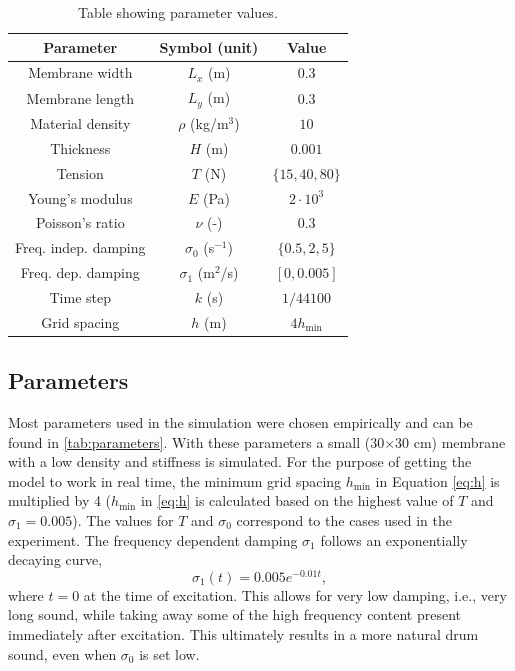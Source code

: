 \documentclass{article}
\begin{document}
\begin{table}[t]
\centering
\begin{tabular}{|c|c|c|}
    \hline
    Parameter & Symbol (unit) & Value \\
    \hline
    Membrane width & $L_x$ (m) & $0.3$\\
    Membrane length & $L_y$ (m) & $0.3$ \\
    Material density & $\rho$ (kg/m$^3$)& $10$ \\
    Thickness & $H$ (m) & $0.001$ \\
    Tension & $T$ (N) & $\{15, 40, 80\}$ \\
    Young's modulus & $E$ (Pa)& $2\cdot 10^3$ \\
    Poisson's ratio & $\nu$ (-)& $0.3$ \\
    Freq. indep. damping & $\sigma_0$ (s$^{-1}$) & $\{0.5, 2, 5\}$\\
    Freq. dep. damping & $\sigma_1$ (m$^2$/s) & $[0, 0.005]$\\
    Time step & $k$ (s) & $1/44100$\\
    Grid spacing & $h$ (m) & $4h_\text{min}$\\
    \hline
\end{tabular}
\caption{Table showing parameter values.}\label{tab:parameters}
\end{table}

\subsection{Parameters}
Most parameters used in the simulation were chosen empirically and can be found in \autoref{tab:parameters}. With these parameters a small (30$\times$30 cm) membrane with a low density and stiffness is simulated. For the purpose of getting the model to work in real time, the minimum grid spacing $h_\text{min}$ in Equation \eqref{eq:h} is multiplied by 4 ($h_\text{min}$ in \eqref{eq:h} is calculated based on the highest value of $T$ and $\sigma_1 = 0.005$). The values for $T$ and $\sigma_0$ correspond to the cases used in the experiment. The frequency dependent damping  $\sigma_1$ follows an exponentially decaying curve, 
\begin{equation}
    \sigma_1(t) = 0.005e^{-0.01 t},
\end{equation}
where $t=0$ at the time of excitation. This allows for very low damping, i.e., very long sound, while taking away some of the high frequency content present immediately after excitation. This ultimately results in a more natural drum sound, even when $\sigma_0$ is set low.
\end{document}
